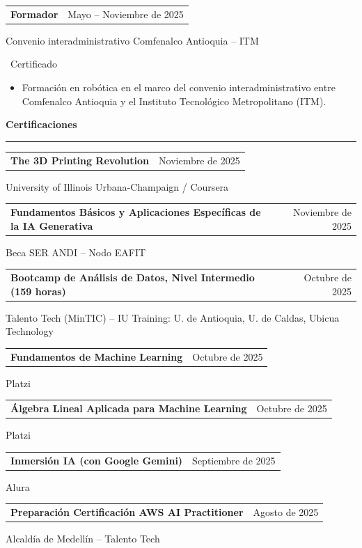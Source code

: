 \documentclass[10pt, letterpaper]{article}
\makeatletter
\newcommand{\SeccionCV}[1]{%
  \needspace{3\baselineskip}%
  \vspace{1.0em}%
  \noindent{\textcolor{AzulITM}{\rule{2.4mm}{2.4mm}}}\hspace{0.5em}%
  {\FuenteTitulo\large\color{AzulITM}\bfseries #1}\\[0.2em]%
  {\color{AzulDigital}\rule{\linewidth}{1.1pt}}%
  \vspace{0.4em}%
}
\newcommand{\ItemCV}[2]{%
  \par\noindent\begin{tabularx}{\linewidth}{@{}X r@{}}
    {\FuenteTitulo\normalsize\color{GrisPizarra}\bfseries #1} &
    {\FuenteCodigo\small\color{GrisMedio}#2}\\
  \end{tabularx}\par\vspace{0.1em}%
}
\newcommand{\Certificado}{%
  \colorbox{VerdeTarea!15}{\color{VerdeTarea}\small\bfseries\strut\ Certificado\ }}
\makeatother
\begin{document}
\vspace{0.5em}

\ItemCV{Formador}{Mayo -- Noviembre de 2025}
Convenio interadministrativo Comfenalco Antioquia -- ITM\quad\Certificado
\begin{itemize}
  \item{} Formación en robótica en el marco del convenio interadministrativo
        entre Comfenalco Antioquia y el Instituto Tecnológico Metropolitano
        (ITM).
\end{itemize}

\SeccionCV{Certificaciones}

\ItemCV{The 3D Printing Revolution}{Noviembre de 2025}
University of Illinois Urbana-Champaign / Coursera

\vspace{0.5em}

\ItemCV{Fundamentos Básicos y Aplicaciones Específicas de la IA Generativa}{Noviembre de 2025}
Beca SER ANDI -- Nodo EAFIT

\vspace{0.5em}

\ItemCV{Bootcamp de Análisis de Datos, Nivel Intermedio (159 horas)}{Octubre de 2025}
Talento Tech (MinTIC) -- IU Training: U. de Antioquia, U. de Caldas, Ubicua Technology

\vspace{0.5em}

\ItemCV{Fundamentos de Machine Learning}{Octubre de 2025}
Platzi

\vspace{0.5em}

\ItemCV{Álgebra Lineal Aplicada para Machine Learning}{Octubre de 2025}
Platzi

\vspace{0.5em}

\ItemCV{Inmersión IA (con Google Gemini)}{Septiembre de 2025}
Alura

\vspace{0.5em}

\ItemCV{Preparación Certificación AWS AI Practitioner}{Agosto de 2025}
Alcaldía de Medellín -- Talento Tech
\end{document}
